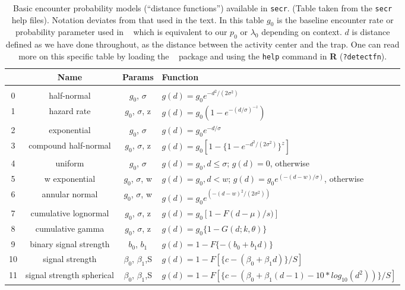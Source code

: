 \begin{table}[ht]
\centering
\caption{
  Basic encounter probability models (``distance functions'')
  available in \mbox{\tt secr}.  (Table taken from
  the 
  \mbox{\tt secr}
  help files). Notation deviates from that used in the text.
  In this table $g_{0}$ is the baseline encounter rate or probability
  parameter used in \secr~ which is equivalent to our $p_{0}$ or
  $\lambda_{0}$ depending on context. $d$ is distance defined as we have done throughout,
  as the distance between the activity center and the trap.
  One can read more on this specific table by loading the \secr~ package and using the
  {\tt help} command in {\bf R} ({\tt ?detectfn}).
}
\begin{tabular}{cccl}
\hline \hline
 & Name & Params & Function  \\ \hline
 \\
0 & half-normal &$g_0$, $\sigma$          &  $g(d) = g_0 e^{-d^2 / (2  \sigma^2)}$  \\
1 &hazard rate  & $g_0$, $\sigma$, z      &  $g(d) = g_0 (1 - e^{-(d / \sigma) ^{-z} })$ \\
2 &exponential   &$g_0$, $\sigma$    &  $g(d) = g_0 e^{- d / \sigma}$ \\
3 &compound half-normal  & $g_0$, $\sigma$, z & $g(d) = g_0 [1 - \{1 - e^{-d^2 /(2 \sigma^2)}\}^z]$ \\
4 &uniform     & $g_0$, $\sigma$     &
\parbox[t]{2in}{ $g(d) = g_{0}, d \leq \sigma$; \\
                 $g(d)= 0$, otherwise
} \\
5 &w exponential            & $g_0$, $\sigma$, w &
\parbox[t]{2in}{ $g(d) = g_{0}, d < w$; \\
                 $g(d) = g_{0} e^{(- (d - w) / \sigma)}$, otherwise
} \\
6 &annular normal           & $g_0$, $\sigma$, w & $g(d) = g_0 e^{(-(d-w)^2 / (2 \sigma^2))}$ \\
7 &cumulative lognormal     & $g_0$, $\sigma$, z & $g(d) = g_0 [1 -F{(d-\mu)/s)}]$  \\
8 &cumulative gamma         & $g_0$, $\sigma$, z  & $g(d) = g_0 \{ 1 - G (d; k,  \theta) \}$  \\
9 &binary signal strength   & $b_0$, $b_1$       & $g(d) = 1 - F \{- (b_0 + b_1 d) \}$ \\
10&signal strength          & $\beta_0$, $\beta_1$,S  &
  $g(d) = 1 - F[ \{c - (\beta_0 + \beta_1 d)\} / S]$  \\
11&signal strength spherical&  $\beta_0$, $\beta_1$,S & 
\parbox[t]{2in}{ $g(d) = 1 - F[\{c - (\beta_0 + \beta_1(d-1)- 10 * log_{10} ( d^2 ) ) \} / S]$ 
} \\ \hline
\end{tabular}
\label{covariates.tab.detmodels}
\end{table}


